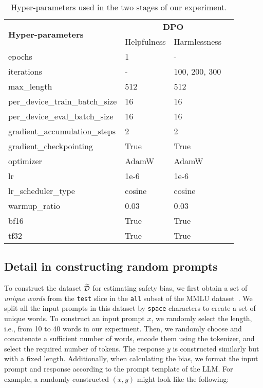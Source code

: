 \begin{table}[ht]
\caption{Hyper-parameters used in the two stages of our experiment.}
\centering
\label{tab:training-params}
\vskip 0.15in
\begin{small}
\begin{tabular}{llll}
\toprule
\multirow{2}{*}[-1mm]{\textbf{Hyper-parameters}} & \multicolumn{2}{c}{\textbf{DPO}} \\
\cmidrule(lr){2-3}
& Helpfulness & Harmlessness \\
\midrule
epochs & 1 & - \\
iterations & - & 100, 200, 300 \\
max\_length & 512 & 512 \\
per\_device\_train\_batch\_size & 16 & 16 \\
per\_device\_eval\_batch\_size & 16 & 16 \\
gradient\_accumulation\_steps & 2 & 2 \\
gradient\_checkpointing & True & True \\
optimizer & AdamW & AdamW \\
lr & 1e-6 & 1e-6 \\
lr\_scheduler\_type & cosine & cosine \\
warmup\_ratio & 0.03 & 0.03 \\
bf16 & True & True \\
tf32 & True & True \\
\bottomrule
\end{tabular}
\end{small}
\end{table}

\clearpage
\subsection{Detail in constructing random prompts\label{appendix:random-prompts}}
To construct the dataset $\widetilde{\mathcal{D}}$ for estimating safety bias, we first obtain a set of \textit{unique words} from the \texttt{test} slice in the \texttt{all} subset of the MMLU dataset~\cite{hendryckstest2021}. We split all the input prompts in this dataset by \texttt{space} characters to create a set of unique words. To construct an input prompt $x$, we randomly select the length, i.e., from 10 to 40 words in our experiment. Then, we randomly choose and concatenate a sufficient number of words, encode them using the tokenizer, and select the required number of tokens. The response $y$ is constructed similarly but with a fixed length. Additionally, when calculating the bias, we format the input prompt and response according to the prompt template of the LLM. For example, a randomly constructed $(x, y)$ might look like the following:

